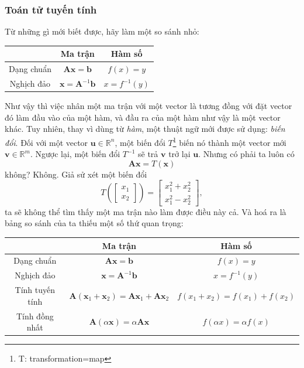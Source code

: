 \subsubsection*{Toán tử tuyến tính}
Từ những gì mới biết được, hãy làm một so sánh nhỏ:
\begin{center}
\begin{tabular}{|c|c|c|}
  \hline
   & Ma trận & Hàm số \\
  \hline
  Dạng chuẩn & \(\mathbf{A}\mathbf{x}=\mathbf{b}\) & \(f(x)=y\) \\
  \hline
   Nghịch đảo& \(\mathbf{x}=\mathbf{A}^{-1}\mathbf{b}\) & \(x=f^{-1}(y)\) \\
  \hline
\end{tabular}
\end{center}
Như vậy thì việc nhân một ma trận với một vector là tương đồng với đặt vector đó làm đầu vào của một hàm, và đầu ra của một hàm như vậy là một vector khác.
Tuy nhiên, thay vì dùng từ \emph{hàm}, một thuật ngữ mới được sử dụng: \emph{biến đổi}. Đối với một vector \(\mathbf{u}\in\mathbb{R}^n\), một biến đổi \(T\)\footnote{T: transformation=map} biến
nó thành một vector mới \(\mathbf{v}\in\mathbb{R}^m\). Ngược lại, một biến đổi \(T^{-1}\) sẽ trả \(\mathbf{v}\) trở lại \(\mathbf{u}\). Nhưng có phải ta luôn có 
\[\mathbf{A}\mathbf{x}=T(\mathbf{x})\] không? Không. Giả sử xét một biến đổi 
\[T\left(\begin{bmatrix}
    x_1\\x_2
\end{bmatrix}\right)=\begin{bmatrix}
    x_{1}^2 +x_{2}^2 \\x_{1}^2 -x_{2}^2
\end{bmatrix},\] ta sẽ không thể tìm thấy một ma trận nào làm được điều này cả. Và hoá ra là bảng so sánh của ta thiếu một số thứ quan trọng:
\begin{center}
\begin{tabular}{|c|c|c|}
  \hline
   & Ma trận & Hàm số \\
  \hline
  Dạng chuẩn & \(\mathbf{A}\mathbf{x}=\mathbf{b}\) & \(f(x)=y\) \\
  \hline
   Nghịch đảo& \(\mathbf{x}=\mathbf{A}^{-1}\mathbf{b}\) & \(x=f^{-1}(y)\) \\
  \hline
  Tính tuyến tính & \(\mathbf{A}(\mathbf{x}_1+\mathbf{x}_2)=\mathbf{A}\mathbf{x}_1 +\mathbf{A}\mathbf{x}_2\) &\(f(x_1 +x_2)=f(x_1)+f(x_2)\)\\
  Tính đồng nhất & \(\mathbf{A}(\alpha\mathbf{x})=\alpha\mathbf{A}\mathbf{x}\)&\(f(\alpha x)=\alpha f(x)\)\\
  \hline
\end{tabular}
\end{center}
